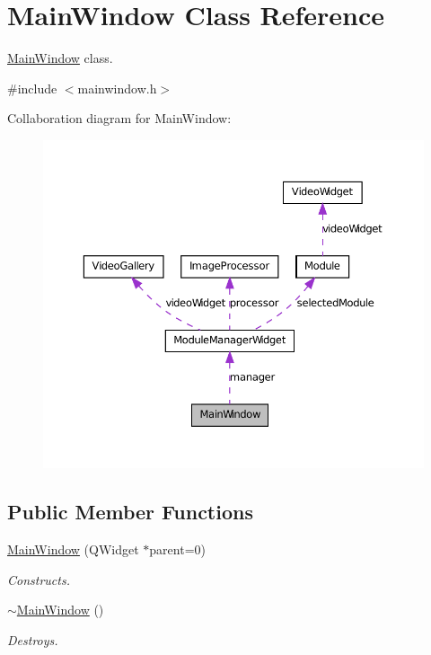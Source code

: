 \hypertarget{class_main_window}{
\section{MainWindow Class Reference}
\label{d9/dc6/class_main_window}
}


\hyperlink{class_main_window}{MainWindow} class.  




{\ttfamily \#include $<$mainwindow.h$>$}



Collaboration diagram for MainWindow:\nopagebreak
\begin{figure}[H]
\begin{center}
\leavevmode
\includegraphics[width=369pt]{d0/db8/class_main_window__coll__graph}
\end{center}
\end{figure}
\subsection*{Public Member Functions}
\begin{DoxyCompactItemize}
\item 
\hyperlink{class_main_window_a8b244be8b7b7db1b08de2a2acb9409db}{MainWindow} (QWidget $\ast$parent=0)
\begin{DoxyCompactList}\small\item\em Constructs. \item\end{DoxyCompactList}\item 
\hypertarget{class_main_window_ae98d00a93bc118200eeef9f9bba1dba7}{
\hyperlink{class_main_window_ae98d00a93bc118200eeef9f9bba1dba7}{$\sim$MainWindow} ()}
\label{d9/dc6/class_main_window_ae98d00a93bc118200eeef9f9bba1dba7}

\begin{DoxyCompactList}\small\item\em Destroys. \item\end{DoxyCompactList}\end{DoxyCompactItemize}


